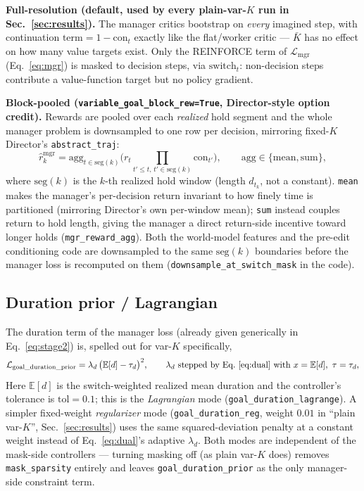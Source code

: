 \documentclass[10pt]{article}
\begin{document}
\textbf{Full-resolution (default, used by every plain-var-$K$ run in
Sec.~\ref{sec:results}).} The manager critics bootstrap on \emph{every}
imagined step, with continuation $\mathrm{term}=1-\mathrm{con}_t$ exactly
like the flat/worker critic --- $\bar K$ has no effect on how many value
targets exist. Only the REINFORCE term of $\mathcal{L}_{\text{mgr}}$
(Eq.~\ref{eq:mgr}) is masked to decision steps, via $\mathrm{switch}_t$:
non-decision steps contribute a value-function target but no policy
gradient.

\textbf{Block-pooled (\texttt{variable\_goal\_block\_rew=True}, Director-style
option credit).} Rewards are pooled over each \emph{realized} hold segment
and the whole manager problem is downsampled to one row per decision, mirroring
fixed-$K$ Director's \texttt{abstract\_traj}:
\begin{equation}
\hat r^{\mathrm{mgr}}_{k} = \mathrm{agg}_{t \in \mathrm{seg}(k)}\Big(r_t \textstyle\prod_{t' \le t,\, t' \in \mathrm{seg}(k)} \mathrm{con}_{t'}\Big),
\qquad \mathrm{agg} \in \{\mathrm{mean}, \mathrm{sum}\},
\label{eq:vark-pool}
\end{equation}
where $\mathrm{seg}(k)$ is the $k$-th realized hold window (length $d_{t_k}$,
not a constant). \texttt{mean} makes the manager's per-decision return
invariant to how finely time is partitioned (mirroring Director's own
per-window mean); \texttt{sum} instead couples return to hold length, giving
the manager a direct return-side incentive toward longer holds
(\texttt{mgr\_reward\_agg}). Both the world-model features and the pre-edit
conditioning code are downsampled to the same $\mathrm{seg}(k)$ boundaries
before the manager loss is recomputed on them (\texttt{downsample\_at\_switch\_mask}
in the code).

\subsection{Duration prior / Lagrangian}
The duration term of the manager loss (already given generically in
Eq.~\ref{eq:stage2}) is, spelled out for var-$K$ specifically,
\begin{equation}
\mathcal{L}_{\text{goal\_duration\_prior}} = \lambda_d\,\big(\mathbb{E}[d]-\tau_d\big)^2,
\qquad \lambda_d \text{ stepped by Eq.~\eqref{eq:dual} with } x = \mathbb{E}[d],\ \tau = \tau_d,
\label{eq:vark-dur-prior}
\end{equation}
Here $\mathbb{E}[d]$ is the switch-weighted realized mean duration and the
controller's tolerance is $\mathrm{tol}{=}0.1$; this is the
\emph{Lagrangian} mode (\texttt{goal\_duration\_lagrange}). A simpler
fixed-weight
\emph{regularizer} mode (\texttt{goal\_duration\_reg}, weight $0.01$ in
``plain var-$K$'', Sec.~\ref{sec:results}) uses the same squared-deviation
penalty at a constant weight instead of Eq.~\ref{eq:dual}'s adaptive
$\lambda_d$. Both modes are independent of the mask-side controllers ---
turning masking off (as plain var-$K$ does) removes \texttt{mask\_sparsity}
entirely and leaves \texttt{goal\_duration\_prior} as the only manager-side
constraint term.
\end{document}
